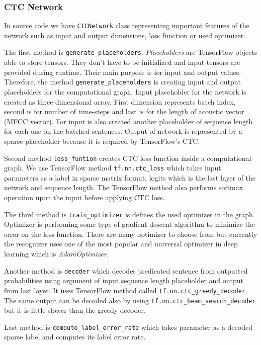 \subsubsection{CTC Network}

In source code we have \texttt{CTCNetwork} class representing important features of the network such as input and output dimensions, loss function or used optimizer.

The first method is \texttt{generate\_placeholders}. \textit{Placeholders} are TensorFlow objects able to store tensors. They don't have to be initialized and input tensors are provided during runtime.
Their main purpose is for input and output values.
Therefore, the method \texttt{generate\_placeholders} is creating input and output placeholders for the computational graph.
Input placeholder for the network is created as three dimensional array. First dimension represents batch index, second is for number of time-steps and last is for the length of acoustic vector (MFCC vector).
For input is also created another placeholder of sequence length for each one on the batched sentences.
Output of network is represented by a sparse placeholder because it is required by TensorFlow's CTC.

Second method \texttt{loss\_funtion} creates CTC loss function inside a computational graph.
We use TensorFlow method \texttt{tf.nn.ctc\_loss} which takes input parameters as a label in sparse matrix format, logits which is the last layer of the network and sequence length.
The TensorFlow method also performs softmax operation upon the input before applying CTC loss.

The third method is \texttt{train\_optimizer} is defines the used optimizer in the graph. Optimizer is performing some type of gradient descent algorithm to minimize the error on the loss function.
There are many optimizer to choose from but currently the recognizer uses one of the most popular and universal optimizer in deep learning which is \textit{AdamOptimizer}.

Another method is \texttt{decoder} which decodes predicated sentence from outputted probabilities using argument of input sequence length placeholder and output from last layer.
It uses TensorFlow method called \texttt{tf.nn.ctc\_greedy\_decoder}. The same output can be decoded also by using \texttt{tf.nn.ctc\_beam\_search\_decoder} but it is little slower than the greedy decoder.

Last method is \texttt{compute\_label\_error\_rate} which takes parameter as a decoded sparse label and computes its label error rate.

